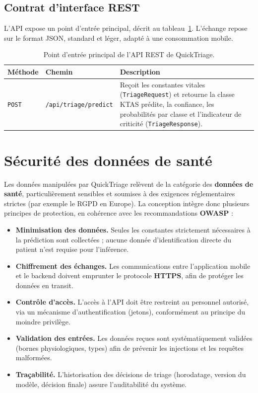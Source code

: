 \subsection{Contrat d'interface REST}
L'API expose un point d'entrée principal, décrit au tableau~\ref{tab:rest}. L'échange repose
sur le format JSON, standard et léger, adapté à une consommation mobile.

\begin{table}[h]
\centering
\renewcommand{\arraystretch}{1.4}
\begin{tabular}{p{2cm} p{4cm} p{7.5cm}}
\toprule
\textbf{Méthode} & \textbf{Chemin} & \textbf{Description} \\
\midrule
\texttt{POST} & \texttt{/api/triage/predict} & Reçoit les constantes vitales
(\texttt{TriageRequest}) et retourne la classe KTAS prédite, la confiance, les probabilités
par classe et l'indicateur de criticité (\texttt{TriageResponse}). \\
\bottomrule
\end{tabular}
\caption{Point d'entrée principal de l'API REST de QuickTriage.}
\label{tab:rest}
\end{table}

\section{Sécurité des données de santé}
Les données manipulées par QuickTriage relèvent de la catégorie des \textbf{données de santé},
particulièrement sensibles et soumises à des exigences réglementaires strictes (par exemple le
RGPD en Europe). La conception intègre donc plusieurs principes de protection, en cohérence avec
les recommandations \textbf{OWASP} :

\begin{itemize}
  \item \textbf{Minimisation des données.} Seules les constantes strictement nécessaires à la
  prédiction sont collectées ; aucune donnée d'identification directe du patient n'est requise
  pour l'inférence.
  \item \textbf{Chiffrement des échanges.} Les communications entre l'application mobile et le
  backend doivent emprunter le protocole \textbf{HTTPS}, afin de protéger les données en transit.
  \item \textbf{Contrôle d'accès.} L'accès à l'API doit être restreint au personnel autorisé,
  via un mécanisme d'authentification (jetons), conformément au principe du moindre privilège.
  \item \textbf{Validation des entrées.} Les données reçues sont systématiquement validées
  (bornes physiologiques, types) afin de prévenir les injections et les requêtes malformées.
  \item \textbf{Traçabilité.} L'historisation des décisions de triage (horodatage, version du
  modèle, décision finale) assure l'auditabilité du système.
\end{itemize}

